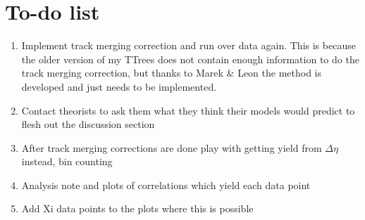 \documentclass[twocolumn,showpacs,preprintnumbers,amsmath,amssymb,letterpaper]{revtex4}
\newcommand{\deta}{$\Delta\eta$\xspace}
\begin{document}
\section{To-do list}
\begin{enumerate}
 \item Implement track merging correction and run over data again.  This is because the older version of my TTrees does not contain enough information to do the track merging correction, but thanks to Marek \& Leon the method is developed and just needs to be implemented.
\item Contact theorists to ask them what they think their models would predict to flesh out the discussion section
\item After track merging corrections are done play with getting yield from \deta instead, bin counting
\item Analysis note and plots of correlations which yield each data point
\item Add Xi data points to the plots where this is possible
\end{enumerate}
\end{document}
